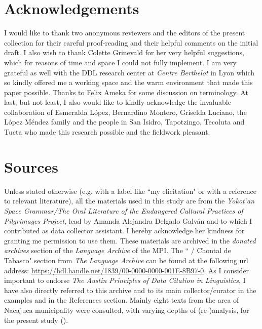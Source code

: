 \documentclass[output=paper
,modfonts
,nonflat]{langsci/langscibook}
\begin{document}
\section*{Acknowledgements}
I would like to thank two anonymous reviewers and the editors of the present collection for their careful proof-reading and their helpful comments on the initial draft. I also wish to thank Colette Grinevald for her very helpful suggestions, which for reasons of time and space I could not fully implement. I am very grateful as well with the DDL research center at \textit{Centre Berthelot} in Lyon which so kindly offered me a working space and the warm environment that made this paper possible. Thanks to Felix Ameka for some discussion on terminology. At last, but not least, I also would like to kindly acknowledge the invaluable collaboration of Esmeralda López, Bernardino Montero, Griselda Luciano, the López Méndez family and the people in San Isidro, Tapotzingo, Tecoluta and Tucta who made this research possible and the fieldwork pleasant.


\section*{Sources}\label{sec:pico:sources}

Unless stated otherwise (e.g. with a label like ``my elicitation" or with a reference to relevant literature), all the materials used in this study are from the \textit{Yokot'an Space Grammar/The Oral Literature of the Endangered Cultural Practices of  Pilgrimages Project}, lead by Amanda Alejandra Delgado Galván and to which I contributed as data collector assistant. I hereby acknowledge her kindness for granting me permission to use them.
These materials are archived in the \textit{donated archives} section of the \textit{Language Archive} of the MPI.
The `` / Chontal de Tabasco" section from \textit{The Language Archive} can be found at the following url address: \url{https://hdl.handle.net/1839/00-0000-0000-001E-8B97-0}.
As I consider important to endorse \textit{The Austin Principles of Data Citation in Linguistics}, I have also directly referred to this archive and to its main collector/curator in the examples and in the References section.
Mainly eight texts from the area of Nacajuca municipality were consulted, with varying depths of (re-)analysis, for the present study ().
\end{document}
